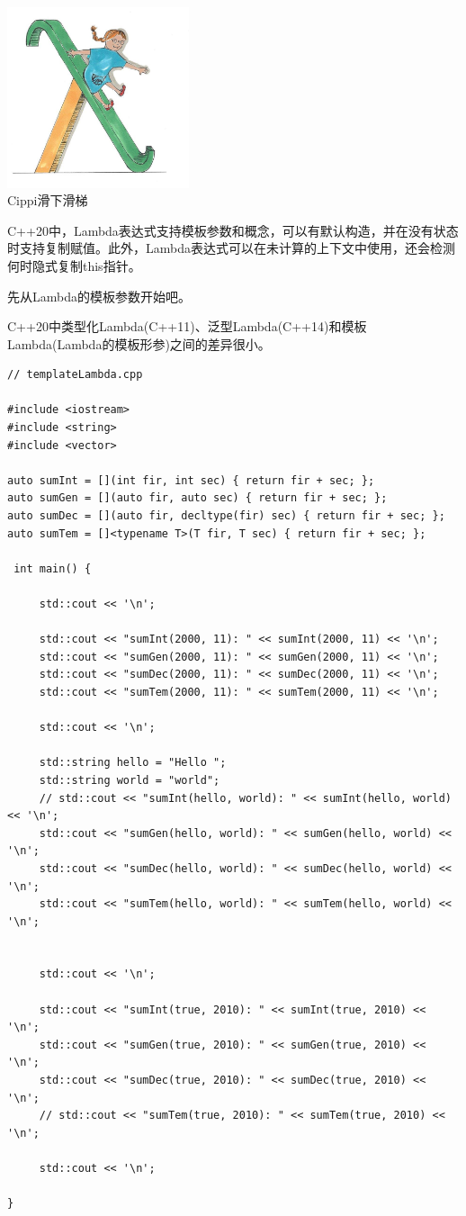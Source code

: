 \begin{center}
\includegraphics[width=0.4\textwidth]{content/3/chapter4/images/41.png}\\
Cippi滑下滑梯
\end{center}

C++20中，Lambda表达式支持模板参数和概念，可以有默认构造，并在没有状态时支持复制赋值。此外，Lambda表达式可以在未计算的上下文中使用，还会检测何时隐式复制this指针。

先从Lambda的模板参数开始吧。


C++20中类型化Lambda(C++11)、泛型Lambda(C++14)和模板Lambda(Lambda的模板形参)之间的差异很小。

\begin{lstlisting}[style=styleCXX]
// templateLambda.cpp

#include <iostream>
#include <string>
#include <vector>

auto sumInt = [](int fir, int sec) { return fir + sec; };
auto sumGen = [](auto fir, auto sec) { return fir + sec; };
auto sumDec = [](auto fir, decltype(fir) sec) { return fir + sec; };
auto sumTem = []<typename T>(T fir, T sec) { return fir + sec; };

 int main() {
	
	 std::cout << '\n';
	
	 std::cout << "sumInt(2000, 11): " << sumInt(2000, 11) << '\n';
	 std::cout << "sumGen(2000, 11): " << sumGen(2000, 11) << '\n';
	 std::cout << "sumDec(2000, 11): " << sumDec(2000, 11) << '\n';
	 std::cout << "sumTem(2000, 11): " << sumTem(2000, 11) << '\n';
	
	 std::cout << '\n';
	
	 std::string hello = "Hello ";
	 std::string world = "world";
	 // std::cout << "sumInt(hello, world): " << sumInt(hello, world) << '\n';
	 std::cout << "sumGen(hello, world): " << sumGen(hello, world) << '\n';
	 std::cout << "sumDec(hello, world): " << sumDec(hello, world) << '\n';
	 std::cout << "sumTem(hello, world): " << sumTem(hello, world) << '\n';
	
	
	 std::cout << '\n';
	
	 std::cout << "sumInt(true, 2010): " << sumInt(true, 2010) << '\n';
	 std::cout << "sumGen(true, 2010): " << sumGen(true, 2010) << '\n';
	 std::cout << "sumDec(true, 2010): " << sumDec(true, 2010) << '\n';
	 // std::cout << "sumTem(true, 2010): " << sumTem(true, 2010) << '\n';
	
	 std::cout << '\n';
	
}
\end{lstlisting}

